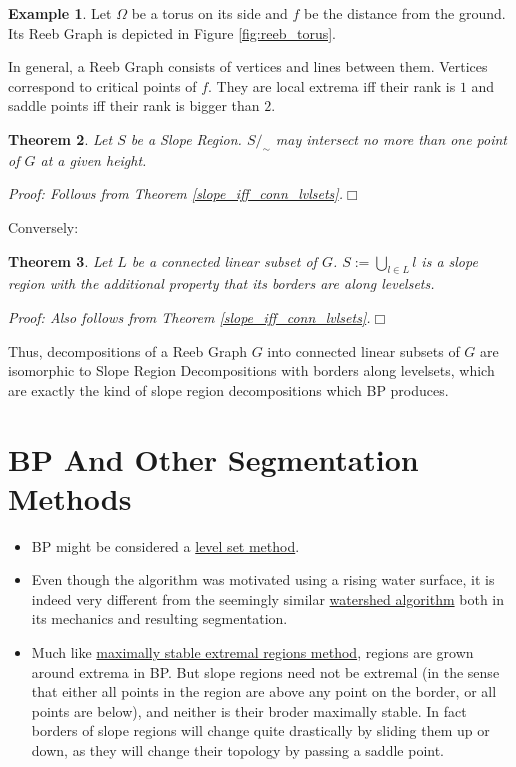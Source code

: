 \documentclass[a4paper,12pt,notitlepage,fullpage]{paper}
\theoremstyle{plain}
\newtheorem{thm}{Theorem}[section] %
\theoremstyle{definition}
\newtheorem{exmp}[thm]{Example} %
\begin{document}
\begin{exmp}
Let $\Omega$ be a torus on its side and $f$ be the distance from the ground. Its Reeb Graph is depicted in Figure \ref{fig:reeb_torus}.
\end{exmp}

In general, a Reeb Graph consists of vertices and lines between them. Vertices correspond to critical points of $f$. They are local extrema iff their rank is $1$ and saddle points iff their rank is bigger than $2$.

\begin{thm}
Let $S$ be a Slope Region. $S/_\sim$ may intersect no more than one point of $G$ at a given height.

\emph{Proof:} Follows from Theorem \ref{slope_iff_conn_lvlsets}.\hfill $\Box$
\end{thm}

Conversely:

\begin{thm}
Let $L$ be a connected linear subset of $G$. $S := \bigcup_{l \in L} l$ is a slope region with the additional property that its borders are along levelsets.

\emph{Proof:} Also follows from Theorem \ref{slope_iff_conn_lvlsets}.\hfill $\Box$
\end{thm}

Thus, decompositions of a Reeb Graph $G$ into connected linear subsets of $G$ are isomorphic to Slope Region Decompositions with borders along levelsets, which are exactly the kind of slope region decompositions which BP produces.


\section{BP And Other Segmentation Methods}
\begin{itemize}
\item BP might be considered a \href{https://en.wikipedia.org/wiki/Level-set_method}{level set method}.
\item Even though the algorithm was motivated using a rising water surface, it is indeed very different from the seemingly similar \href{https://en.wikipedia.org/wiki/Watershed_(image_processing)}{watershed algorithm} both in its mechanics and resulting segmentation.
\item Much like \href{https://en.wikipedia.org/wiki/Maximally_stable_extremal_regions}{maximally stable extremal regions method}, regions are grown around extrema in BP. But slope regions need not be extremal (in the sense that either all points in the region are above any point on the border, or all points are below), and neither is their broder maximally stable. In fact borders of slope regions will change quite drastically by sliding them up or down, as they will change their topology by passing a saddle point.
\end{itemize}
\end{document}
